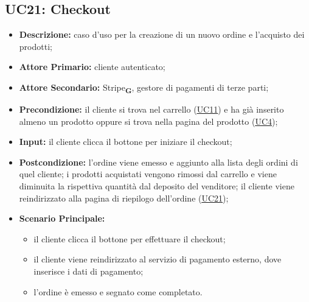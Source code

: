 
\subsection{UC21: Checkout}
\label{sec:UC21}
\begin{itemize}
    \item \textbf{Descrizione:} caso d'uso per la creazione di un nuovo ordine e l'acquisto dei prodotti;
    \item \textbf{Attore Primario:} cliente autenticato;
    \item \textbf{Attore Secondario:} Stripe\textsubscript{\textbf{G}}, gestore di pagamenti di terze parti;
    \item \textbf{Precondizione:} il cliente si trova nel carrello (\hyperref[sec:UC11]{\underline{UC11}}) e ha già inserito almeno un prodotto oppure si trova nella pagina del prodotto (\hyperref[sec:UC4]{\underline{UC4}});
    \item \textbf{Input:} il cliente clicca il bottone per iniziare il checkout;
    \item \textbf{Postcondizione:} l'ordine viene emesso e aggiunto alla lista degli ordini di quel cliente; i prodotti acquistati vengono rimossi dal carrello e viene diminuita la rispettiva quantità dal deposito del venditore; il cliente viene reindirizzato alla pagina di riepilogo dell'ordine (\hyperref[sec:UC21]{\underline{UC21}});
    \item \textbf{Scenario Principale:}
          \begin{itemize}
              \item il cliente clicca il bottone per effettuare il checkout;
              \item il cliente viene reindirizzato al servizio di pagamento esterno, dove inserisce i dati di pagamento;
              \item l'ordine è emesso e segnato come completato.
          \end{itemize}

\end{itemize}
